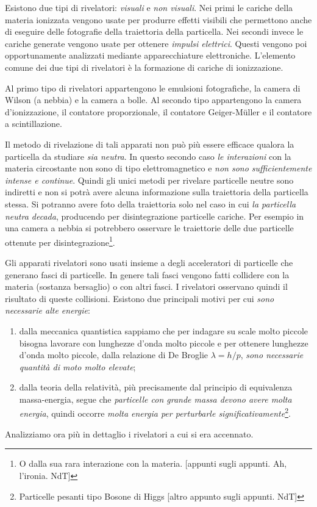 Esistono due tipi di rivelatori: \textit{visuali} e \textit{non visuali}. Nei
primi le cariche della materia ionizzata vengono usate per produrre effetti
visibili che permettono anche di eseguire delle fotografie della traiettoria
della particella. Nei secondi invece le cariche generate vengono usate per
ottenere \textit{impulsi elettrici}. Questi vengono poi opportunamente
analizzati mediante apparecchiature elettroniche. L'elemento comune dei due
tipi di rivelatori è la formazione di cariche di ionizzazione.

Al primo tipo di rivelatori appartengono le emulsioni fotografiche, la camera
di Wilson (a nebbia) e la camera a bolle. Al secondo tipo appartengono la
camera d'ionizzazione, il contatore proporzionale, il contatore Geiger-M\"uller
e il contatore a scintillazione.

Il metodo di rivelazione di tali apparati non può più essere efficace qualora
la particella da studiare \textit{sia neutra}. In questo secondo caso
\textit{le interazioni} con la materia circostante non sono di tipo
elettromagnetico e \textit{non sono sufficientemente intense e continue}.
Quindi gli unici metodi per rivelare particelle neutre sono indiretti e non si
potrà avere alcuna informazione sulla traiettoria della particella stessa. Si
potranno avere foto della traiettoria solo nel caso in cui
\textit{la particella neutra decada}, producendo per disintegrazione particelle
cariche. Per esempio in una camera a nebbia si potrebbero osservare le
traiettorie delle due particelle ottenute per
disintegrazione\footnote{O dalla sua rara interazione con la materia. [appunti
sugli appunti. Ah, l'ironia. NdT]}.

Gli apparati rivelatori sono usati insieme a degli acceleratori di particelle
che generano fasci di particelle. In genere tali fasci vengono fatti collidere
con la materia (sostanza bersaglio) o con altri fasci. I rivelatori osservano
quindi il risultato di queste collisioni. Esistono due principali motivi per
cui \textit{sono necessarie alte energie}:
\begin{enumerate}
 \item dalla meccanica quantistica sappiamo che per indagare su scale molto 
piccole bisogna lavorare con lunghezze d'onda molto piccole e per ottenere 
lunghezze d'onda molto piccole, dalla relazione di De Broglie $\lambda = h/p$, 
\textit{sono necessarie quantità di moto molto elevate};
 \item dalla teoria della relatività, più precisamente dal principio di 
equivalenza massa-energia, segue che \textit{particelle con grande massa devono 
avere molta energia}, quindi occorre \textit{molta energia per perturbarle 
significativamente}\footnote{Particelle pesanti tipo Bosone di Higgs [altro 
appunto sugli appunti. NdT]}.
\end{enumerate}
Analizziamo ora più in dettaglio i rivelatori a cui si era accennato.
